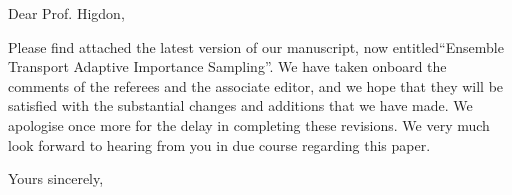 \documentclass{letter}
\begin{document}
\date{}
\begin{letter}{ }

\opening{Dear Prof. Higdon,}

Please find attached the latest version of our manuscript, now
entitled``Ensemble Transport Adaptive Importance Sampling''. We have
taken onboard the comments of the referees and the associate editor,
and we hope that they will be satisfied with the substantial changes
and additions that we have made. We apologise once more for the delay
in completing these revisions. We very much look forward to hearing from you in due course regarding this paper.

\closing{Yours sincerely,}
\end{letter}
\end{document}
